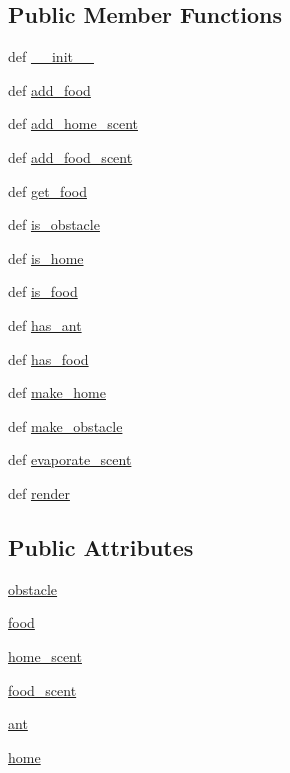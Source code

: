 \subsection*{Public Member Functions}
\begin{DoxyCompactItemize}
\item 
def \hyperlink{classworld_1_1Cell_a3dd387b6af13f7450acb97fb40c13a0e}{\+\_\+\+\_\+init\+\_\+\+\_\+}
\item 
def \hyperlink{classworld_1_1Cell_a3d9725f56b584acd9f75728f364975b0}{add\+\_\+food}
\item 
def \hyperlink{classworld_1_1Cell_a52af74786918c6c3f4d1d0b0f44aecb8}{add\+\_\+home\+\_\+scent}
\item 
def \hyperlink{classworld_1_1Cell_a773c26b2353ffaede745ee726d2e256d}{add\+\_\+food\+\_\+scent}
\item 
def \hyperlink{classworld_1_1Cell_ace4b7ca65667e6dcecb3c43e850c3568}{get\+\_\+food}
\item 
def \hyperlink{classworld_1_1Cell_a890e2dc899a32ef86c131a98879e9023}{is\+\_\+obstacle}
\item 
def \hyperlink{classworld_1_1Cell_a441597e0ea2cff7fce907a12fd8216fa}{is\+\_\+home}
\item 
def \hyperlink{classworld_1_1Cell_a90eabca5d79eef89b2ae4f677a88a93b}{is\+\_\+food}
\item 
def \hyperlink{classworld_1_1Cell_a98e3cac3c42374693afe0aded7a1e06c}{has\+\_\+ant}
\item 
def \hyperlink{classworld_1_1Cell_a1097df1a6fe0131898377358017fe7bc}{has\+\_\+food}
\item 
def \hyperlink{classworld_1_1Cell_adb830df07e437189375efa6c9ad4981e}{make\+\_\+home}
\item 
def \hyperlink{classworld_1_1Cell_a63164a3e74888a97b07ee8e06c633c2a}{make\+\_\+obstacle}
\item 
def \hyperlink{classworld_1_1Cell_add0fb2c9e6c963d012cf7e65008b8947}{evaporate\+\_\+scent}
\item 
def \hyperlink{classworld_1_1Cell_a11f263897c7a04ae900af84d30a30c56}{render}
\end{DoxyCompactItemize}
\subsection*{Public Attributes}
\begin{DoxyCompactItemize}
\item 
\hyperlink{classworld_1_1Cell_aeaf17388b8c9000fe612ab043418825c}{obstacle}
\item 
\hyperlink{classworld_1_1Cell_a401fde7236825c1843dad8764c2fb4a8}{food}
\item 
\hyperlink{classworld_1_1Cell_a0ef4adaadea1ccdcd1b61c70e242aa4a}{home\+\_\+scent}
\item 
\hyperlink{classworld_1_1Cell_acec0cb9d8a7eb92bedf71dc57641efbe}{food\+\_\+scent}
\item 
\hyperlink{classworld_1_1Cell_abfd9b278ac86f77970b7766a7c2e3231}{ant}
\item 
\hyperlink{classworld_1_1Cell_a9baf3378be8090bf1faf1b19b9aa5fd3}{home}
\end{DoxyCompactItemize}


